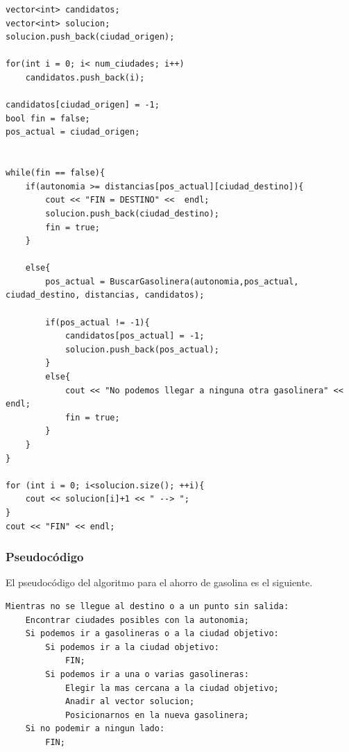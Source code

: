 \documentclass[11pt,a4paper]{article} %
\begin{document}
\begin{lstlisting}[style=C++]
vector<int> candidatos;
vector<int> solucion;
solucion.push_back(ciudad_origen);

for(int i = 0; i< num_ciudades; i++)
	candidatos.push_back(i);

candidatos[ciudad_origen] = -1;
bool fin = false;
pos_actual = ciudad_origen;


while(fin == false){
	if(autonomia >= distancias[pos_actual][ciudad_destino]){
		cout << "FIN = DESTINO" <<  endl;
		solucion.push_back(ciudad_destino);
		fin = true;
	}

	else{
		pos_actual = BuscarGasolinera(autonomia,pos_actual, ciudad_destino, distancias, candidatos);
	
		if(pos_actual != -1){
			candidatos[pos_actual] = -1;
			solucion.push_back(pos_actual);
		}
		else{
			cout << "No podemos llegar a ninguna otra gasolinera" << endl;
			fin = true;
		}
	}
}

for (int i = 0; i<solucion.size(); ++i){
	cout << solucion[i]+1 << " --> ";
}
cout << "FIN" << endl;
\end{lstlisting}

\subsubsection{Pseudocódigo}
El pseudocódigo del algoritmo para el ahorro de gasolina es el siguiente.
\begin{lstlisting}
Mientras no se llegue al destino o a un punto sin salida:
	Encontrar ciudades posibles con la autonomia;
	Si podemos ir a gasolineras o a la ciudad objetivo:
		Si podemos ir a la ciudad objetivo:
			FIN;
		Si podemos ir a una o varias gasolineras:
			Elegir la mas cercana a la ciudad objetivo;
			Anadir al vector solucion;
			Posicionarnos en la nueva gasolinera;
	Si no podemir a ningun lado:
		FIN;
\end{lstlisting}
\end{document}
